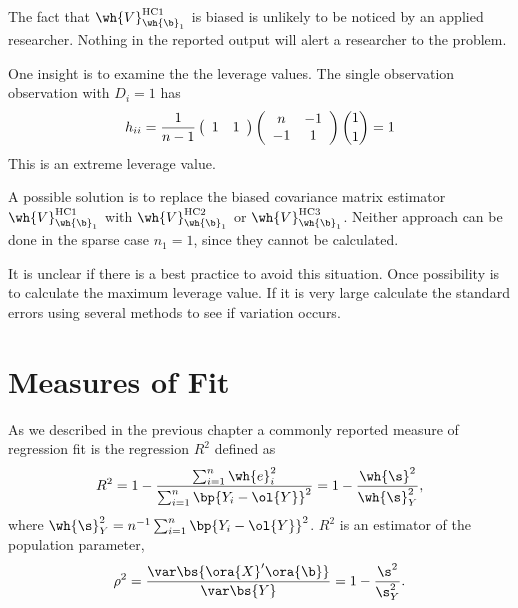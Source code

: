 The fact that $\wh{V}_{\wh{\b}_1}^{\text{HC1}}$ is biased is unlikely to be noticed by an applied researcher. Nothing in the reported output will alert a researcher to the problem.

One insight is to examine the the leverage values. The single observation observation with $D_i = 1$ has 
\begin{equation}
    \notag 
    h_{i i}=\frac{1}{n-1}\left(\begin{array}{ll}
        1 & 1
        \end{array}\right)\left(\begin{array}{cc}
        n & -1 \\
        -1 & 1
        \end{array}\right)\binom{1}{1}=1
\end{equation}
This is an extreme leverage value.

A possible solution is to replace the biased covariance matrix estimator $\wh{V}_{\wh{\b}_1}^{\text{HC1}}$ with $\wh{V}_{\wh{\b}_1}^{\text{HC2}}$ or $\wh{V}_{\wh{\b}_1}^{\text{HC3}}$. Neither approach can be done in the sparse case $n_1 = 1$, since they cannot be calculated.

It is unclear if there is a best practice to avoid this situation. Once possibility is to calculate the maximum leverage value. If it is very large calculate the standard errors using several methods to see if variation occurs.


\setcounter{section}{19}

\section{Measures of Fit}

As we described in the previous chapter a commonly reported measure of regression fit is the regression $R^2$ defined as 
\begin{equation}
    \notag
    R^2 = 1 - \frac{\sum_{i=1}^{n} \wh{e}_i^2}{\sum_{i=1}^n \bp{Y_i - \ol{Y}}^2} = 1 - \frac{\wh{\s}^2}{\wh{\s}_Y^2},
\end{equation}
where $\wh{\s}_Y^2 = n^{-1} \sum_{i=1}^n \bp{Y_i - \ol{Y}}^2$. $R^2$ is an estimator of the population parameter,
\begin{equation}
    \notag
    \rho^2 = \frac{\var\bs{\ora{X}^\prime \ora{\b}}}{\var\bs{Y}} = 1 - \frac{\s^2}{\s_Y^2}.
\end{equation}

